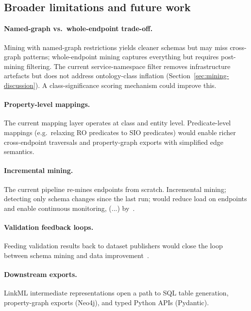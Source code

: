 \documentclass[12pt]{article}
\begin{document}
\subsection{Broader limitations and future work}


\paragraph*{Named-graph vs.\ whole-endpoint trade-off.}
Mining with named-graph restrictions yields cleaner schemas but may
miss cross-graph patterns; whole-endpoint mining captures everything
but requires post-mining filtering.
The current service-namespace filter removes infrastructure artefacts
but does not address ontology-class inflation
(Section~\ref{sec:mining-discussion}).
A class-significance scoring mechanism could improve this.

\paragraph*{Property-level mappings.}
The current mapping layer operates at class and entity level.
Predicate-level mappings (e.g.\ relaxing RO predicates to SIO
predicates) would enable richer cross-endpoint traversals and
property-graph exports with simplified edge semantics.

\paragraph*{Incremental mining.}
The current pipeline re-mines endpoints from scratch.
Incremental mining; detecting only schema changes since the last
run; would reduce load on endpoints and enable continuous monitoring,
(...) %
by~\cite{kamdar_empirical_2021}.

\paragraph*{Validation feedback loops.}
Feeding validation results back to dataset publishers would close the loop between schema mining and data
improvement~\cite{mihindukulasooriya_rdf_2018}.

\paragraph*{Downstream exports.}
LinkML intermediate representations open a path to SQL table
generation, property-graph exports (Neo4j), and typed Python APIs
(Pydantic).





\end{document}
